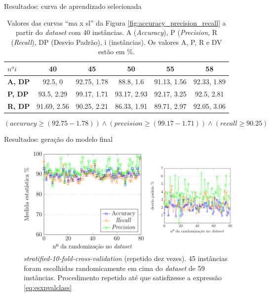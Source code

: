 \documentclass[brazil]{beamer}
\begin{document}
\begin{frame}{Resultados: curva de aprendizado selecionada}
   \begin{table}[!htp]
     \centering
     \begin{tabular}{ |l|c c c c c|}
       \hline
          {\bf \textbf{$n^o i$}} & {\bf 40} & {\bf 45} & {\bf 50} & {\bf 55} & {\bf 58} \\
       \hline
          \textbf{A, DP} & 92.5, 0 & 92.75, 1.78 & 88.8, 1.6 & 91.13, 1.56 & 92.33, 1.89 \\
       \hline
          \textbf{P, DP} & 93.5, 2.29 & 99.17, 1.71 & 93.17, 2.93 &  92.17, 3.25 & 92.5, 2.81 \\
       \hline
          \textbf{R, DP} & 91.69, 2.56 & 90.25, 2.21 & 86.33, 1.91 & 89.71, 2.97 & 92.05, 3.06 \\
       \hline
     \end{tabular}
     \caption{Valores das curvas ``ma x sl'' da Figura \ref{fig:accuracy_precision_recall} a partir do \textit{dataset} com 40 instâncias. A (\textit{Accuracy}), P (\textit{Precision}, R (\textit{Recall}), DP (Desvio Padrão), i (instâncias). Os valores A, P, R e DV estão em \%.}
     \label{table:valorescurva}
   \end{table}

   \begin{equation}
     (\textit{accuracy} \geq (92.75-1.78)) \wedge (\textit{precision} \geq (99.17-1.71)) \wedge (\textit{recall} \geq 90.25)
     \label{eq:esxpvalclass}
   \end{equation}

\end{frame}

\begin{frame}{Resultados: geração do modelo final}
   \begin{figure}[!htb] \centering 
     \centering
     \includegraphics[width=1.0\columnwidth]{slide/apr45_dev} 
     \caption{\textit{stratified-10-fold-cross-validation} (repetido dez vezes). 45 instâncias foram escolhidas randomicamente em cima do \textit{dataset} de 59 instâncias. Procedimento repetido até que satisfizesse a expressão \ref{eq:esxpvalclass} } 
     \label{fig:apr45_dev}
   \end{figure}
\end{frame}
\end{document}
